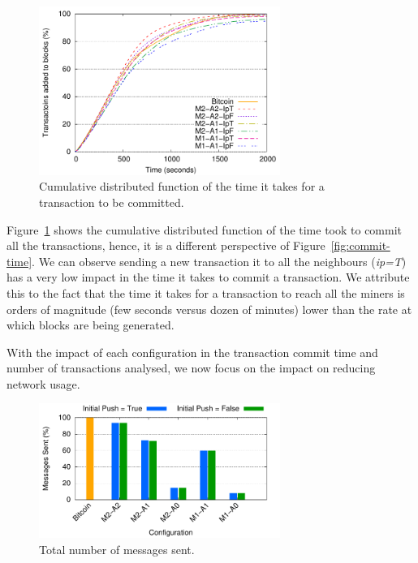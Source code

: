 \begin{figure}
\centering
\includegraphics[width=0.7\textwidth]{plots/cdf_commit.pdf}
\caption{Cumulative distributed function of the time it takes for a transaction to be committed.}
\label{fig:cdf-commit}
\end{figure}

Figure~\ref{fig:cdf-commit} shows the cumulative distributed function of the time took to commit all the transactions, hence, it is a different perspective of Figure~\ref{fig:commit-time}. We can  observe sending a new transaction it to all the neighbours (\emph{ip=T}) has a very low impact in the time it takes to commit a transaction.
We attribute this to the fact that the time it takes for a transaction to reach all the miners is orders of magnitude (few seconds versus dozen of minutes) lower than the rate at which blocks are being generated.

With the impact of each configuration in the transaction commit time and number of transactions analysed, we now focus on the impact on reducing network usage.

\begin{figure}
\centering
\includegraphics[width=0.7\textwidth]{plots/msg-sent.pdf}
\caption{Total number of messages sent.}
\label{fig:msg-sent}
\end{figure}

